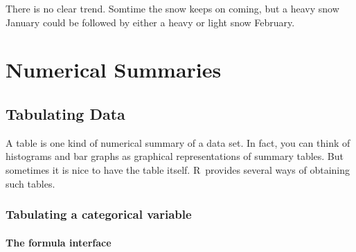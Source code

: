 \documentclass[twoside]{book}\usepackage[]{graphicx}\usepackage[]{xcolor}
\newenvironment{knitrout}{}{} %
\def\Chapter#1{%
\chapter{#1}
}
\def\R{{\sf R}}
\newif\ifsolutions
\newif\ifsolutionslocal
\begin{document}
\begin{solution}
\begin{knitrout}
{}



\end{knitrout}
There is no clear trend.  Somtime the snow keeps on coming, but a heavy snow
January could be followed by either a heavy or light snow February.
\end{solution}
\shipoutProblems

\ifsolutions
\ifsolutionslocal
\newpage
\section*{Solutions}
\shipoutSolutions
\fi
\fi




\Chapter{Numerical Summaries}

\section{Tabulating Data}
A table is one kind of numerical summary of a data set.  In fact, you can think of histograms
and bar graphs as graphical representations of summary tables.  But sometimes it is nice to
have the table itself.  \R\ provides several ways of obtaining such tables.

\subsection{Tabulating a categorical variable}

\subsubsection*{The formula interface}
\end{document}
